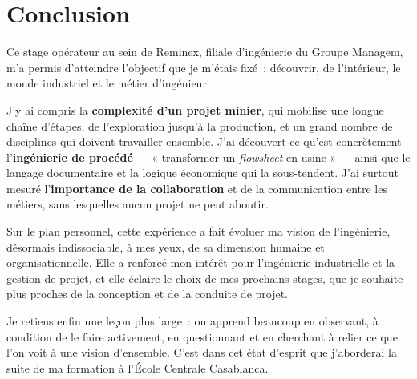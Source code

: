 \chapter*{Conclusion}

Ce stage opérateur au sein de Reminex, filiale d'ingénierie du Groupe Managem, m'a permis d'atteindre l'objectif que je m'étais fixé~: découvrir, de l'intérieur, le monde industriel et le métier d'ingénieur.

J'y ai compris la \textbf{complexité d'un projet minier}, qui mobilise une longue chaîne d'étapes, de l'exploration jusqu'à la production, et un grand nombre de disciplines qui doivent travailler ensemble. J'ai découvert ce qu'est concrètement l'\textbf{ingénierie de procédé} --- « transformer un \textit{flowsheet} en usine » --- ainsi que le langage documentaire et la logique économique qui la sous-tendent. J'ai surtout mesuré l'\textbf{importance de la collaboration} et de la communication entre les métiers, sans lesquelles aucun projet ne peut aboutir.

Sur le plan personnel, cette expérience a fait évoluer ma vision de l'ingénierie, désormais indissociable, à mes yeux, de sa dimension humaine et organisationnelle. Elle a renforcé mon intérêt pour l'ingénierie industrielle et la gestion de projet, et elle éclaire le choix de mes prochains stages, que je souhaite plus proches de la conception et de la conduite de projet.

Je retiens enfin une leçon plus large~: on apprend beaucoup en observant, à condition de le faire activement, en questionnant et en cherchant à relier ce que l'on voit à une vision d'ensemble. C'est dans cet état d'esprit que j'aborderai la suite de ma formation à l'École Centrale Casablanca.
